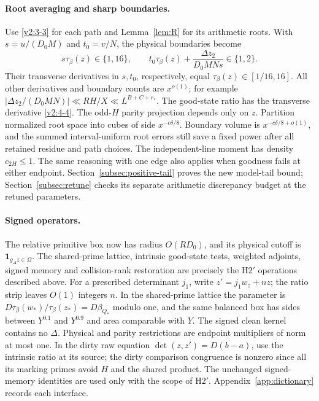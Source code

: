 \documentclass[11pt]{article}
\theoremstyle{definition}
\newcommand{\ind}{\mathbf 1}
\theoremstyle{remark}
\numberwithin{equation}{section}
\begin{document}
\paragraph{Root averaging and sharp boundaries.}
Use \eqref{v2:3-3} for each path and Lemma~\ref{lem:R} for its
arithmetic roots. With $s=u/(D_0M)$ and $t_0=v/N$, the physical
boundaries become
\begin{equation}\label{v2:4-5}
 s\tau_\beta(z)\in\{1,16\},\qquad
 t_0\tau_\beta(z)+\frac{\Delta z_2}{D_0MNs}\in\{1,2\}.
\end{equation}
Their transverse derivatives in $s,t_0$, respectively, equal
$\tau_\beta(z)\in[1/16,16]$. All other derivatives and boundary
counts are $x^{o(1)}$; for example
$|\Delta z_2/(D_0MN)|\ll RH/X\ll L^{B+C+r_*}$.
The good-state ratio has the transverse derivative
\eqref{v2:4-4}. The odd-$H$ parity projection depends only on
$z$. Partition normalized root space into cubes of side
$x^{-c\delta/8}$. Boundary volume is
$x^{-c\delta/8+o(1)}$, and the summed interval-uniform root errors
still save a fixed power after all retained residue and path
choices. The independent-line moment has density $c_{2H}\le1$.
The same reasoning with one edge also applies when goodness fails
at either endpoint. Section~\ref{subsec:positive-tail} proves the
new model-tail bound; Section~\ref{subsec:retune} checks its separate
arithmetic discrepancy budget at the retuned parameters.

\paragraph{Signed operators.}
The relative primitive box now has radius $O(RD_0)$, and its
physical cutoff is $\ind_{g_\Delta z\in\Omega}$. The shared-prime
lattice, intrinsic good-state tests, weighted adjoints, signed
memory and collision-rank restoration are precisely the
$\mathrm H2'$ operations described above. For a prescribed
determinant $j_1$, write $z'=j_1w_z+nz$; the ratio strip leaves
$O(1)$ integers $n$. In the shared-prime lattice the parameter
is $D\tau_\beta(w_*)/\tau_\beta(z_*)=D\beta_{Q_*}$ modulo one,
and the same balanced box has sides between $Y^{0.1}$ and
$Y^{0.9}$ and area comparable with $Y$. The signed clean kernel
contains no $\Delta$. Physical and parity restrictions are
endpoint multipliers of norm at most one. In the dirty raw
equation $\det(z,z')=D(b-a)$, use the intrinsic ratio at its
source; the dirty comparison congruence is nonzero since all its
marking primes avoid $H$ and the shared product. The unchanged
signed-memory identities are used only with the scope of
$\mathrm H2'$. Appendix~\ref{app:dictionary} records each interface.
\end{document}
